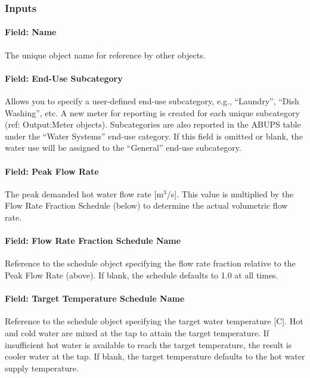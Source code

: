 \subsubsection{Inputs}\label{inputs-053}

\paragraph{Field: Name}\label{field-name-051}

The unique object name for reference by other objects.

\paragraph{Field: End-Use Subcategory}\label{field-end-use-subcategory-005}

Allows you to specify a user-defined end-use subcategory, e.g., ``Laundry'', ``Dish Washing'', etc. A new meter for reporting is created for each unique subcategory (ref: Output:Meter objects). Subcategories are also reported in the ABUPS table under the ``Water Systems'' end-use category. If this field is omitted or blank, the water use will be assigned to the ``General'' end-use subcategory.

\paragraph{Field: Peak Flow Rate}\label{field-peak-flow-rate-000}

The peak demanded hot water flow rate {[}m\(^{3}\)/s{]}. This value is multiplied by the Flow Rate Fraction Schedule (below) to determine the actual volumetric flow rate.

\paragraph{Field: Flow Rate Fraction Schedule Name}\label{field-flow-rate-fraction-schedule-name-000}

Reference to the schedule object specifying the flow rate fraction relative to the Peak Flow Rate (above). If blank, the schedule defaults to 1.0 at all times.

\paragraph{Field: Target Temperature Schedule Name}\label{field-target-temperature-schedule-name}

Reference to the schedule object specifying the target water temperature {[}C{]}. Hot and cold water are mixed at the tap to attain the target temperature. If insufficient hot water is available to reach the target temperature, the result is cooler water at the tap. If blank, the target temperature defaults to the hot water supply temperature.

